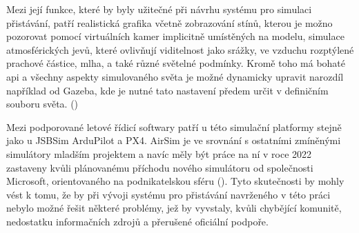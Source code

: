         Mezi její funkce, které by byly užitečné při návrhu systému pro simulaci přistávání, patří realistická grafika včetně zobrazování stínů, kterou je možno pozorovat pomocí virtuálních kamer implicitně umístěných na modelu, simulace atmosférických jevů, které ovlivňují viditelnost jako srážky, ve vzduchu rozptýlené prachové částice, mlha, a také různé světelné podmínky. Kromě toho má bohaté \acrshort{api} a všechny aspekty simulovaného světa je možné dynamicky upravit narozdíl například od Gazeba, kde je nutné tato nastavení předem určit v definičním souboru světa. (\cite{airsim})

        Mezi podporované letové řídicí softwary patří u této simulační platformy stejně jako u JSBSim ArduPilot a PX4. AirSim je ve srovnání s ostatními zmíněnými simulátory mladším projektem a navíc měly být práce na ní v roce 2022 zastaveny kvůli plánovanému příchodu nového simulátoru od společnosti Microsoft, orientovaného na podnikatelskou sféru (\cite{airsimweb}). Tyto skutečnosti by mohly vést k tomu, že by při vývoji systému pro přistávání navrženého v této práci nebylo možné řešit některé problémy, jež by vyvstaly, kvůli chybějící komunitě, nedostatku informačních zdrojů a přerušené oficiální podpoře.